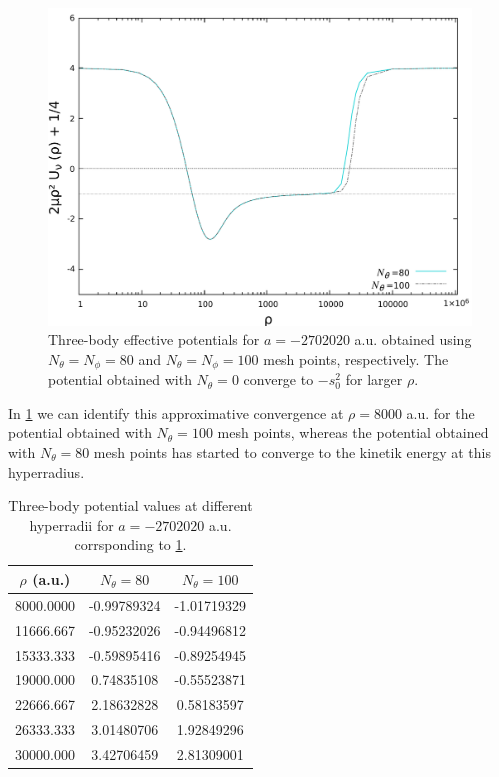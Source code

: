 \begin{figure}
	\includegraphics[width=\linewidth]{diffdiff.pdf}
	\caption{Three-body effective potentials for $a=-2702020$ a.u. obtained using $N_{\theta}=N_{\phi}=80$ and $N_{\theta}=N_{\phi}=100$ mesh points, respectively. The potential obtained with $N_{\theta}=0$ converge to $-s_0^2$ for larger $\rho$.}
	\label{fig:res_4}
\end{figure}
In \cref{table:Res_1} we can identify this approximative convergence at $\rho=8000$ a.u. for the potential obtained with $N_{\theta}=100$ mesh points, whereas the potential obtained with $N_{\theta}=80$ mesh points has started to converge to the kinetik energy at this hyperradius.  

\begin{table}[h!]
	\centering
	\begin{tabular}{||c c c||} 
		\hline
		$\rho$ (a.u.) & $N_{\theta}=80$ & $N_{\theta}=100$  \\ [0.5ex] 
		\hline\hline
		8000.0000   & -0.99789324     & -1.01719329  \\ 
		11666.667	 & -0.95232026   & -0.94496812  \\
		15333.333   & -0.59895416  & -0.89254945  \\
		19000.000   & 0.74835108  & -0.55523871   \\
		22666.667   & 2.18632828  & 0.58183597   \\
		26333.333   & 3.01480706  & 1.92849296  \\  
		30000.000   & 3.42706459 & 2.81309001  \\ [1ex] 
		\hline
	\end{tabular}
	\caption{Three-body potential values at different hyperradii for $a = -2702020$ a.u. corrsponding to \cref{fig:res_4}.}
	\label{table:Res_1}
\end{table} 

